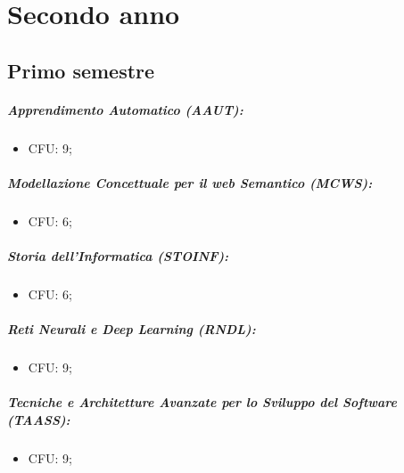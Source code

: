 \chapter{Secondo anno}

\section{Primo semestre}

\paragraph{Apprendimento Automatico (AAUT):}

\begin{itemize}
  \item CFU: 9;
\end{itemize}

\paragraph{Modellazione Concettuale per il web Semantico (MCWS):}

\begin{itemize}
  \item CFU: 6;
\end{itemize}

\paragraph{Storia dell'Informatica (STOINF):}

\begin{itemize}
  \item CFU: 6;
\end{itemize}

\paragraph{Reti Neurali e Deep Learning (RNDL):}

\begin{itemize}
  \item CFU: 9;
\end{itemize}

\paragraph{Tecniche e Architetture Avanzate per
lo Sviluppo del Software (TAASS):}

\begin{itemize}
  \item CFU: 9;
\end{itemize}

